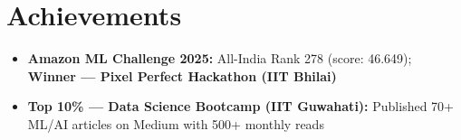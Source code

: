 \documentclass[letterpaper,11pt]{article}
\begin{document}
\section{Achievements}
{\small
\begin{itemize}[leftmargin=0.15in, label={}]
  \item \textbf{Amazon ML Challenge 2025:} All-India Rank 278 (score: 46.649); \textbf{Winner — Pixel Perfect Hackathon (IIT Bhilai)}
  \item \textbf{Top 10\% — Data Science Bootcamp (IIT Guwahati):} Published 70+ ML/AI articles on Medium with 500+ monthly reads
\end{itemize}
}
\end{document}
